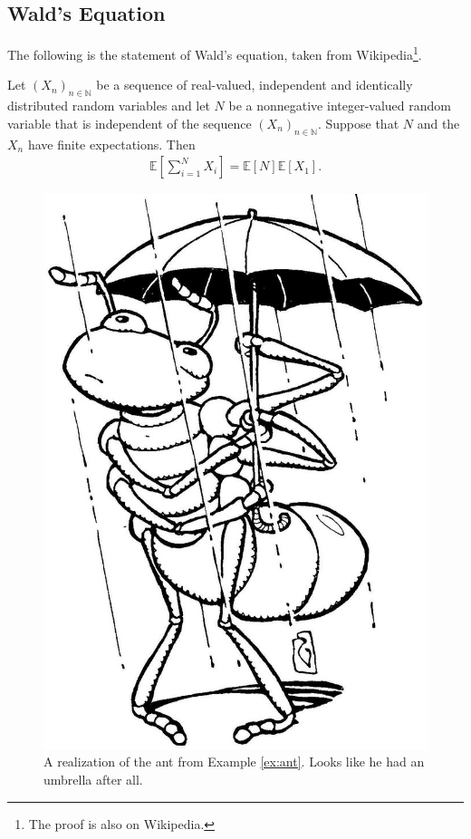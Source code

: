\documentclass[../../../Master/AppliedStochastics.tex]{subfiles}
\begin{document}
\subsection{Wald's Equation}
The following is the statement of Wald's equation, taken from 
Wikipedia\footnote{The proof is also on Wikipedia.}.
\begin{theorem}
	Let $(X_n)_{n\in\mathbb{N}}$ be a sequence of real-valued, independent and 
	identically distributed random variables and let $N$ be a nonnegative 
	integer-valued random variable that is independent of the sequence 
	$(X_n)_{n\in\mathbb{N}}$. Suppose that $N$ and the $X_n$ have finite 
	expectations. Then
	\begin{align}\label{eq:wald}
		\mathbb{E}\left[ \sum_{i=1}^N X_i \right] = \mathbb{E}\left[N 
		\right]\mathbb{E}\left[ X_1\right].
	\end{align}
\end{theorem}
\begin{figure}
	\centering
	\label{fig:rainant}
	\caption{A realization of the ant from Example \ref{ex:ant}. Looks like he 
	had an umbrella after all.}
	\includegraphics[width=0.7\linewidth]{rain_ant}
\end{figure}


%
\end{document}
